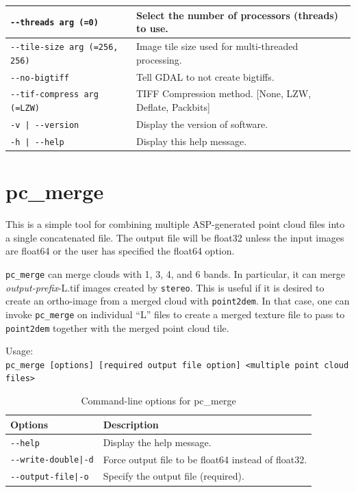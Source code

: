 \begin{longtable}{|l|p{7.5cm}|}
\texttt{-\/-threads arg (=0) } & Select the number of processors (threads) to use.\\ \hline
\texttt{-\/-tile-size arg (=256, 256) } & Image tile size used for multi-threaded processing.\\ \hline
\texttt{-\/-no-bigtiff  } & Tell GDAL to not create bigtiffs.\\ \hline
\texttt{-\/-tif-compress arg (=LZW) } & TIFF Compression method. [None, LZW, Deflate, Packbits]\\ \hline
\texttt{-v | -\/-version   } & Display the version of software.\\ \hline
\texttt{-h | -\/-help   } & Display this help message.\\ \hline
\end{longtable}

\section{pc\_merge}
\label{pcmerge}

This is a simple tool for combining multiple ASP-generated point cloud files into
a single concatenated file.  The output file will be float32 unless the input images
are float64 or the user has specified the float64 option.

\texttt{pc\_merge} can merge clouds with
1, 3, 4, and 6 bands. In particular, it can merge \textit{output-prefix}-L.tif images
created by \texttt{stereo}. This is useful if it is desired to create an
ortho-image from a merged cloud with \texttt{point2dem}. In that case,
one can invoke \texttt{pc\_merge} on individual ``L'' files to create a
merged texture file to pass to \texttt{point2dem} together with the
merged point cloud tile.


\medskip

Usage:\\
\hspace*{2em}\texttt{pc\_merge [options] [required output file option] <multiple point cloud files>}

\medskip

\begin{longtable}{|l|p{10cm}|}
\caption{Command-line options for pc\_merge}
\label{tbl:pcmerge}
\endfirsthead
\endhead
\endfoot
\endlastfoot
\hline
Options & Description \\ \hline \hline
\texttt{-\/-help} & Display the help message.\\ \hline
\texttt{-\/-write-double|-d} & Force output file to be float64 instead of float32.\\ \hline
\texttt{-\/-output-file|-o} & Specify the output file (required).\\ \hline
\end{longtable}

